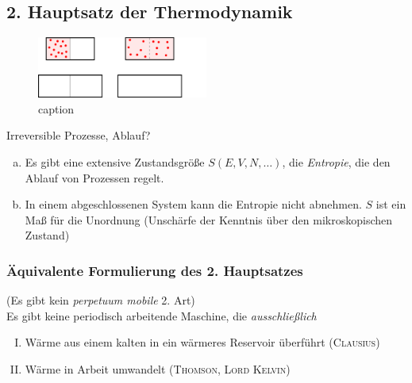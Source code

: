 \subsection{2. Hauptsatz der Thermodynamik}
\begin{figure}[H]
    \begin{center}
        \includegraphics[width=0.5\textwidth]{../img/irrevProcess.pdf}
        \caption{caption}  %
        \label{img:irrevProcess}
    \end{center}
\end{figure}
Irreversible Prozesse, Ablauf?
\begin{enumerate}[a)]
    \item Es gibt eine extensive Zustandsgröße $S(E, V, N, \ldots)$, die \emph{Entropie}, die den Ablauf von Prozessen regelt.
    \item In einem abgeschlossenen System kann die Entropie nicht abnehmen. $S$ ist ein Maß für die Unordnung
    (Unschärfe der Kenntnis über den mikroskopischen Zustand)
\end{enumerate}

\subsubsection{Äquivalente Formulierung des 2. Hauptsatzes}
(Es gibt kein \emph{perpetuum mobile} 2. Art) \\
Es gibt keine periodisch arbeitende Maschine, die \emph{ausschließlich}
\begin{enumerate}[I.]
    \item Wärme aus einem kalten in ein wärmeres Reservoir überführt (\textsc{Clausius})
    \item Wärme in Arbeit umwandelt (\textsc{Thomson}, \textsc{Lord Kelvin})
\end{enumerate}
